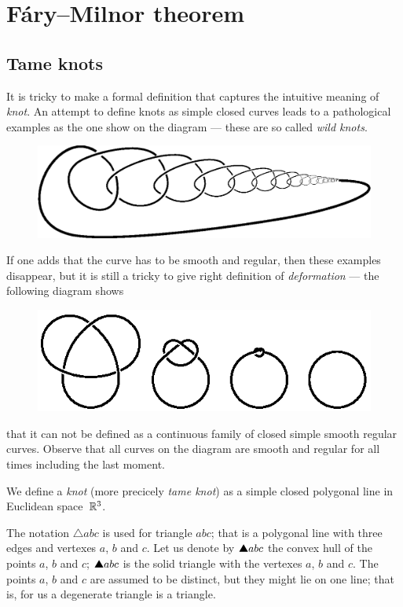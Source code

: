 \chapter{F\'ary--Milnor theorem}

\section{Tame knots}

It is tricky to make a formal definition that captures the intuitive meaning of \emph{knot}.
An attempt to define knots as simple closed curves leads to a pathological examples as the one show on the diagram --- these are so called \emph{wild knots}.
\begin{figure}[h]
\vskip-0mm
\centering
\includegraphics[scale=.6]{pics/Wild_knot}
\vskip0mm
\end{figure}
If one adds that the curve has to be smooth and regular,
then these examples disappear, but it is still a tricky to give right definition of \emph{deformation} --- the following diagram shows 
\begin{figure}[h]
\vskip-0mm
\centering
\includegraphics[scale=1]{pics/knot}
\vskip0mm
\end{figure}
that it can not be defined as a continuous family of closed simple smooth regular curves. 
Observe that all curves on the diagram are smooth and regular for all times including the last moment.

We define a \emph{knot} (more precicely \emph{tame knot}) as a simple closed polygonal line in Euclidean space~$\mathbb{R}^3$.

The notation $\triangle abc$ is used for triangle $abc$; that is a polygonal line with three edges and vertexes $a$, $b$ and $c$.
Let us denote by $\solidtriangle abc$ the convex hull of the points $a$, $b$ and $c$; $\solidtriangle abc$ is the solid triangle with the vertexes $a$, $b$ and $c$.
The points $a$, $b$ and $c$ are assumed to be distinct, but they might lie on one line;
that is, for us a degenerate triangle is a triangle.

